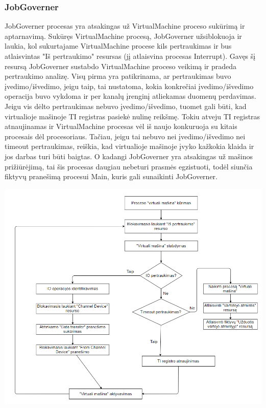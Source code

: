 \documentclass{scrartcl}
\begin{document}
      \subsubsection{JobGoverner}
        JobGoverner procesas yra atsakingas už VirtualMachine proceso sukūrimą ir aptarnavimą. Sukūręs VirtualMachine procesą, JobGoverner užsiblokuoja ir laukia, kol sukurtajame VirtualMachine procese kils pertraukimas ir bus atlaisvintas "Iš pertraukimo" resursas (jį atlaisvina procesas Interrupt). Gavęs šį resursą JobGoverner sustabdo VirtualMachine proceso veikimą ir pradeda pertraukimo analizę. Visų pirma yra patikrinama, ar pertraukimas buvo įvedimo/išvedimo, jeigu taip, tai nustatoma, kokia konkrečiai įvedimo/išvedimo operacija buvo vykdoma ir per kanalų įrenginį atliekamas duomenų perdavimas. Jeigu vis dėlto pertraukimas nebuvo įvedimo/išvedimo, tuomet gali būti, kad virtualioje mašinoje TI registras pasiekė nulinę reikšmę. Tokiu atveju TI registras atnaujinamas ir VirtualMachine procesas vėl iš naujo konkuruoja su kitais procesais dėl procesoriaus. Tačiau, jeigu tai nebuvo nei įvedimo/išvedimo nei timeout pertraukimas, reiškia, kad virtualioje mašinoje įvyko kažkokia klaida ir jos darbas turi būti baigtas. O kadangi JobGoverner yra atsakingas už mašinos prižiūrėjimą, tai šis procesas daugiau nebeturi prasmės egzistuoti, todėl siunčia fiktyvų pranešimą procesui Main, kuris gali sunaikinti JobGoverner.
        \begin{center}
          \includegraphics[width=\textwidth]{JobGoverner}
        \end{center}
\end{document}
